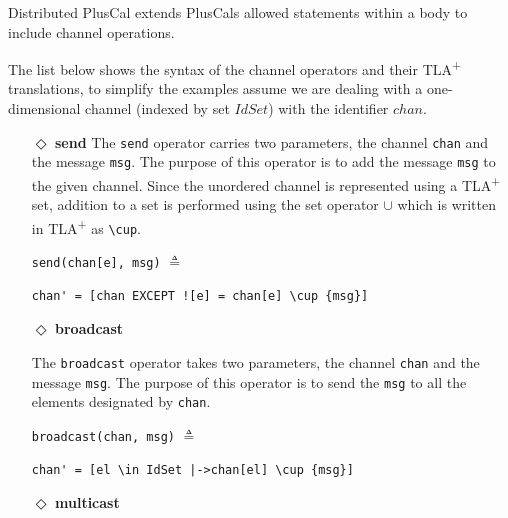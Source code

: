 \documentclass{thesul}
\newcommand{\tlaplus}{TLA\textsuperscript{+}\xspace}
\begin{document}
Distributed PlusCal extends PlusCals allowed statements within a body to include channel operations.

The list below shows the syntax of the channel operators and their \tlaplus translations, to simplify the examples assume we are dealing with a one-dimensional channel (indexed by set $IdSet$) with the identifier $chan$.

\begin{itemize}
\item[$\Diamond$]  \textbf{send} The \verb|send| operator carries two parameters, the channel \verb|chan| and the message \verb|msg|. The purpose of this operator is to add the message \verb|msg| to
the given channel. Since the unordered channel is represented using a \tlaplus set, addition to a set is performed using the set operator $\cup$ which is written in \tlaplus as \lstinline|\cup|.


\begin{minipage}{.24\textwidth}

\lstinline|send(chan[e], msg)| $\triangleq$
\end{minipage}\hfill
\begin{minipage}{\textwidth}
\begin{lstlisting}[frame = none, numbers = none]
chan' = [chan EXCEPT ![e] = chan[e] \cup {msg}]
\end{lstlisting}

\end{minipage}\hfill

\item[$\Diamond$]  \textbf{broadcast}

The \verb|broadcast| operator takes two parameters, the channel \verb|chan| and the message \verb|msg|. The purpose of this operator is to send the \verb|msg| to all the elements designated by \verb|chan|.

\begin{minipage}{.25\textwidth}

\lstinline|broadcast(chan, msg)| $\triangleq$
\end{minipage}\hfill
\begin{minipage}{.8\textwidth}
\begin{lstlisting}[frame = none, numbers = none]
chan' = [el \in IdSet |->chan[el] \cup {msg}]
\end{lstlisting}

\end{minipage}\hfill

\item[$\Diamond$] \textbf{multicast}


\end{itemize}
\end{document}
